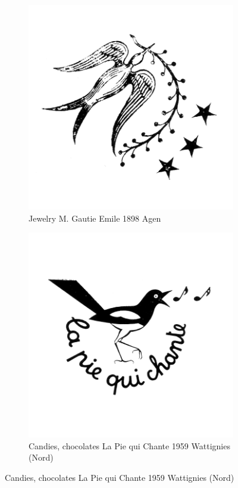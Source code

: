 \begin{figure}[h]
  \begin{subfigure}{.45\textwidth}
    \centering
    \includegraphics[width=.5\linewidth]{images/supplement/trademarks/french/12_2}
    \caption{Jewelry M. Gautie Emile 1898 Agen}
    \label{fig:trademarks:french:12.2}
  \end{subfigure}\hfill
  \begin{subfigure}{.45\textwidth}
    \centering
    \includegraphics[width=.5\linewidth]{images/supplement/trademarks/french/12_12}
    \caption{Candies, chocolates La Pie qui Chante 1959 Wattignies (Nord)}
    \label{fig:trademarks:french:12.12}
  \end{subfigure}


\end{figure}
